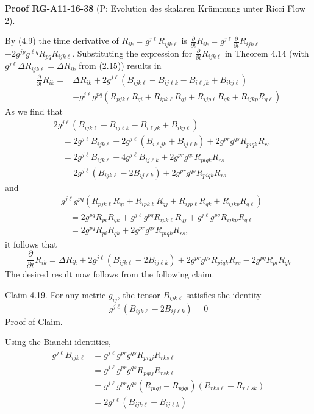 \documentclass[10pt, letterpaper]{article}
\newcommand{\CustomHeading}[3]{%
  \par\medskip\noindent%
  \textbf{#1 #2} \textnormal{(#3)}.\enskip%
}
\newenvironment{PROOF}[2]{\begin{unitbox}\CustomHeading{Proof}{#1}{#2}}{\end{unitbox}}
\begin{document}
\begin{PROOF}{RG-A11-16-38}{P: Evolution des skalaren Krümmung unter Ricci Flow 2}
By (4.9) the time derivative of $R_{i k}=g^{j \ell} R_{i j k \ell}$ is $\frac{\partial}{\partial t} R_{i k}=g^{j \ell} \frac{\partial}{\partial t} R_{i j k \ell}$ $-2 g^{j p} g^{\ell q} R_{p q} R_{i j k \ell}$. Substituting the expression for $\frac{\partial}{\partial t} R_{i j k \ell}$ in Theorem 4.14 (with $g^{j \ell} \Delta R_{i j k \ell}=\Delta R_{i k}$ from (2.15)) results in
$$\begin{aligned}
\frac{\partial}{\partial t} R_{i k}= & \Delta R_{i k}+2 g^{j \ell}\left(B_{i j k \ell}-B_{i j \ell k}-B_{i \ell j k}+B_{i k j \ell}\right) \\
& -g^{j \ell} g^{p q}\left(R_{p j k \ell} R_{q i}+R_{i p k \ell} R_{q j}+R_{i j p \ell} R_{q k}+R_{i j k p} R_{q \ell}\right)
\end{aligned}$$
As we find that
$$\begin{aligned}
& 2 g^{j \ell}\left(B_{i j k \ell}-B_{i j \ell k}-B_{i \ell j k}+B_{i k j \ell}\right) \\
& \quad=2 g^{j \ell} B_{i j k \ell}-2 g^{j \ell}\left(B_{i \ell j k}+B_{i j \ell k}\right)+2 g^{p r} g^{q s} R_{p i q k} R_{r s} \\
& \quad=2 g^{j \ell} B_{i j k \ell}-4 g^{j \ell} B_{i j \ell k}+2 g^{p r} g^{q s} R_{p i q k} R_{r s} \\
& \quad=2 g^{j \ell}\left(B_{i j k \ell}-2 B_{i j \ell k}\right)+2 g^{p r} g^{q s} R_{p i q k} R_{r s}
\end{aligned}$$
and
$$\begin{aligned}
& g^{j \ell} g^{p q}\left(R_{p j k \ell} R_{q i}+R_{i p k \ell} R_{q j}+R_{i j p \ell} R_{q k}+R_{i j k p} R_{q \ell}\right) \\
& \quad=2 g^{p q} R_{p i} R_{q k}+g^{j \ell} g^{p q} R_{i p k \ell} R_{q j}+g^{j \ell} g^{p q} R_{i j k p} R_{q \ell} \\
& \quad=2 g^{p q} R_{p i} R_{q k}+2 g^{p r} g^{q s} R_{p i q k} R_{r s},
\end{aligned}$$
it follows that
$$\frac{\partial}{\partial t} R_{i k}=\Delta R_{i k}+2 g^{j \ell}\left(B_{i j k \ell}-2 B_{i j \ell k}\right)+2 g^{p r} g^{q s} R_{p i q k} R_{r s}-2 g^{p q} R_{p i} R_{q k}$$
The desired result now follows from the following claim.

Claim 4.19. For any metric $g_{i j}$, the tensor $B_{i j k \ell}$ satisfies the identity
$$g^{j \ell}\left(B_{i j k \ell}-2 B_{i j \ell k}\right)=0$$
Proof of Claim. 

Using the Bianchi identities,
$$\begin{aligned}
g^{j \ell} B_{i j k \ell} & =g^{j \ell} g^{p r} g^{q s} R_{p i q j} R_{r k s \ell} \\
& =g^{j \ell} g^{p r} g^{q s} R_{p q i j} R_{r s k \ell} \\
& =g^{j \ell} g^{p r} g^{q s}\left(R_{p i q j}-R_{p j q i}\right)\left(R_{r k s \ell}-R_{r \ell s k}\right) \\
& =2 g^{j \ell}\left(B_{i j k \ell}-B_{i j \ell k}\right)
\end{aligned}$$
\end{PROOF}
\end{document}
